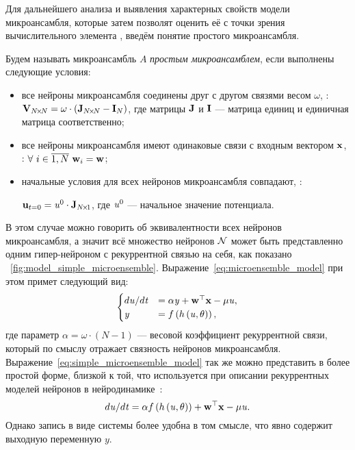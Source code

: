 Для дальнейшего анализа и выявления характерных свойств модели микроансамбля, которые затем позволят оценить её с точки зрения вычислительного элемента , введём понятие простого микроансамбля.
\begin{Definition*}
    Будем называть микроансамбль $A$ \textit{простым микроансамблем}, если выполнены следующие условия:
    \begin{itemize}
        \item все нейроны микроансамбля соединены друг с другом связями весом $\omega$, \ie: $\mathrm{\mathbf{V}}_{N\!\times\!N} = \omega \cdot \left( \mathrm{\mathbf{J}}_{N\!\times\!N} - \mathrm{\mathbf{I}}_{N} \right)$, где матрицы $\mathrm{\mathbf{J}}$ и $\mathrm{\mathbf{I}}$  --- матрица единиц и единичная матрица соответственно;
        \item все нейроны микроансамбля имеют одинаковые связи с входным вектором $\mathrm{\mathbf{x}}$, \ie: $\forall\ i \in \overline{1,N}\ \mathrm{\mathbf{w}}_{i} = \mathrm{\mathbf{w}}$;
        \item начальные условия для всех нейронов микроансамбля совпадают, \ie: \par $\mathrm{\mathbf{u}}_{t=0} = \mathit{u}^{0} \cdot \mathrm{\mathbf{J}}_{N\!\times\!1}$, где $\mathit{u}^{0}$ --- начальное значение потенциала.
    \end{itemize}
\end{Definition*}

В этом случае можно говорить об эквивалентности всех нейронов микроансамбля, а значит всё множество нейронов $\mathcal{N}$ может быть представленно одним гипер-нейроном с рекуррентной связью на себя, как показано \onfigure~\ref{fig:model_simple_microensemble}. Выражение~\eqref{eq:microensemble_model} при этом примет следующий вид:
\begin{equation}
    \label{eq:simple_microensemble_model}
    \begin{cases}
        d\mathit{u}/d\mathit{t} &= \alpha \mathit{y} + \mathrm{\mathbf{w}}^{\top} \mathrm{\mathbf{x}} - \mu \mathit{u}, \\
        \mathit{y}              &= f\left( h\left( \mathit{u}, \theta \right) \right), \\
    \end{cases}
\end{equation}
где параметр $\alpha = \omega \cdot \left( N - 1 \right)$ --- весовой коэффициент рекуррентной связи, который по смыслу отражает связность нейронов микроансамбля. Выражение~\eqref{eq:simple_microensemble_model} так же можно представить в более простой форме, близкой к той, что используется при описании рекуррентных моделей нейронов в нейродинамике~\cite{Haykin2008}:
\begin{equation}
    \nonumber
    d\mathit{u}/d\mathit{t} = \alpha f\left( h\left( \mathit{u}, \theta \right) \right) + \mathrm{\mathbf{w}}^{\top} \mathrm{\mathbf{x}} - \mu \mathit{u}.
\end{equation}
Однако запись в виде системы более удобна в том смысле, что явно содержит выходную переменную $y$.

